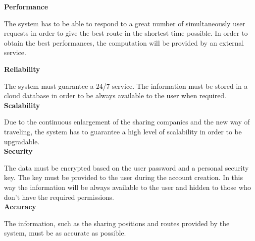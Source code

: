 \vspace{0.5cm}
\textbf{Performance}\par
\vspace{0.2cm}
The system has to be able to respond to a great number of simultaneously user requests in order to give the best route in the shortest time possible. In order to obtain the best performances, the computation will be provided by an external service.
\newpage

\indent \textbf{Reliability}
\vspace{0.2cm}\par
The system must guarantee a 24/7 service. The information must be stored in a cloud database in order to be always available to the user when required.
\vspace{0.5cm}\\

\indent \textbf{Scalability}
\vspace{0.2cm}\par
Due to the continuous enlargement of the sharing companies and the new way of traveling, the system has to guarantee a high level of scalability in order to be upgradable.
\vspace{0.5cm}\\

\indent \textbf{Security}
\vspace{0.2cm}\par
The data must be encrypted based on the user password and a personal security key. The key must be provided to the user during the account creation. In this way the information will be always available to the user and hidden to those who don’t have the required permissions.
\vspace{0.5cm}\\

\indent \textbf{Accuracy}
\vspace{0.2cm}\par
The information, such as the sharing positions and routes provided by the system, must be as accurate as possible.